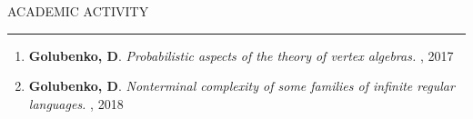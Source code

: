 \documentclass{resume} %
\renewenvironment{rSection}[1]{
\sectionskip
\textcolor{RoyalPurple}{\MakeUppercase{#1}}
\sectionlineskip
\hrule
\begin{list}{}{
\setlength{\leftmargin}{1.5em}
}
\item[]
}{
\end{list}
}
\begin{document}






\begin{rSection}{Academic Activity}


\begin{enumerate}
  \leftskip-0.13in %
  \item \textbf{Golubenko, D}. \textit{Probabilistic aspects of the theory of vertex algebras.} , 2017

  
  \item \textbf{Golubenko, D}. \textit{Nonterminal complexity of some families of infinite regular languages.} , 2018



\end{enumerate}

\end{rSection}
\end{document}
